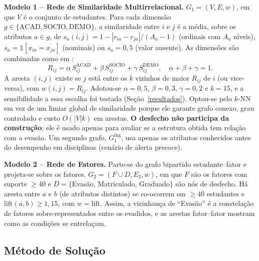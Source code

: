 \textbf{Modelo 1 -- Rede de Similaridade Multirrelacional.} $G_1=(V,E,w)$, em que $V$ é o conjunto de estudantes. Para cada dimensão $g\in\{\mathrm{ACAD},\mathrm{SOCIO},\mathrm{DEMO}\}$, a similaridade entre $i$ e $j$ é a média, sobre os atributos $a\in g$, de $s_a(i,j)=1-|r_{ia}-r_{ja}|/(A_a-1)$ (ordinais com $A_a$ níveis), $s_a=\mathbb{1}[x_{ia}=x_{ja}]$ (nominais) ou $s_a=0{,}5$ (valor ausente). As dimensões são combinadas como em \citet{porto2025}:
\begin{equation}
R_{ij}=\alpha\,S^{\mathrm{ACAD}}_{ij}+\beta\,S^{\mathrm{SOCIO}}_{ij}+\gamma\,S^{\mathrm{DEMO}}_{ij},\quad \alpha+\beta+\gamma=1.
\end{equation}
A aresta $(i,j)$ existe se $j$ está entre os $k$ vizinhos de maior $R_{ij}$ de $i$ (ou vice-versa), com $w(i,j)=R_{ij}$. Adotou-se $\alpha=0{,}5$, $\beta=0{,}3$, $\gamma=0{,}2$ e $k=15$, e a sensibilidade a essa escolha foi testada (Seção~\ref{resultados}). Optou-se pelo $k$-NN em vez de um limiar global de similaridade porque ele garante grafo conexo, grau controlado e custo $O(|V|k)$ em arestas. \textbf{O desfecho não participa da construção}: ele é usado apenas para avaliar se a estrutura obtida tem relação com a evasão. Um segundo grafo, $G_1^{\mathrm{ing}}$, usa apenas os atributos conhecidos antes do desempenho em disciplinas (cenário de alerta precoce).

\textbf{Modelo 2 -- Rede de Fatores.} Parte-se do grafo bipartido estudante--fator e projeta-se sobre os fatores. $G_2=(F\cup D, E_2, w)$, em que $F$ são os fatores com suporte $\geq 40$ e $D=\{$Evasão, Matriculado, Graduado$\}$ são nós de desfecho. Há aresta entre $a$ e $b$ (de atributos distintos) se co-ocorrem em $\geq 40$ estudantes e $\mathrm{lift}(a,b)\geq 1{,}15$, com $w=\mathrm{lift}$. Assim, a vizinhança de ``Evasão'' é a constelação de fatores sobre-representados entre os evadidos, e as arestas fator--fator mostram como as condições se entrelaçam.


\subsection{Método de Solução}
\label{ssec:solucao}

